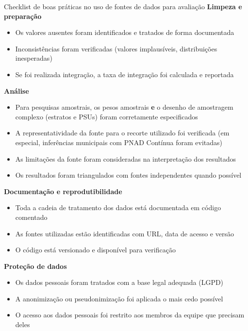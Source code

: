 \begin{boxdestaque}{Checklist de boas práticas no uso de fontes de dados para avaliação}
\textbf{Limpeza e preparação}
\begin{itemize}
  \item[$\square$] Os valores ausentes foram identificados e tratados de forma documentada
  \item[$\square$] Inconsistências foram verificadas (valores implausíveis, distribuições inesperadas)
  \item[$\square$] Se foi realizada integração, a taxa de integração foi calculada e reportada
\end{itemize}

\textbf{Análise}
\begin{itemize}
  \item[$\square$] Para pesquisas amostrais, os pesos amostrais \textbf{e} o desenho de amostragem complexo (estratos e PSUs) foram corretamente especificados
  \item[$\square$] A representatividade da fonte para o recorte utilizado foi verificada (em especial, inferências municipais com PNAD Contínua foram evitadas)
  \item[$\square$] As limitações da fonte foram consideradas na interpretação dos resultados
  \item[$\square$] Os resultados foram triangulados com fontes independentes quando possível
\end{itemize}

\textbf{Documentação e reprodutibilidade}
\begin{itemize}
  \item[$\square$] Toda a cadeia de tratamento dos dados está documentada em código comentado
  \item[$\square$] As fontes utilizadas estão identificadas com URL, data de acesso e versão
  \item[$\square$] O código está versionado e disponível para verificação
\end{itemize}

\textbf{Proteção de dados}
\begin{itemize}
  \item[$\square$] Os dados pessoais foram tratados com a base legal adequada (LGPD)
  \item[$\square$] A anonimização ou pseudonimização foi aplicada o mais cedo possível
  \item[$\square$] O acesso aos dados pessoais foi restrito aos membros da equipe que precisam deles
\end{itemize}
\end{boxdestaque}

